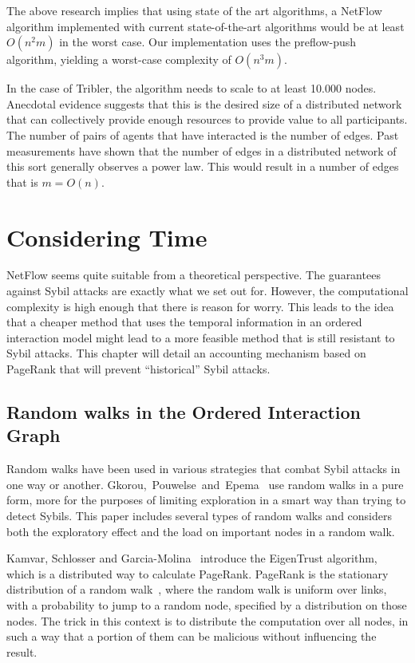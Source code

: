 \documentclass[a4paper,11pt]{book}
\theoremstyle{definition}
\begin{document}
The above research implies that using state of the art algorithms, a NetFlow algorithm
implemented with current state-of-the-art algorithms would be at least $O(n^2m)$ in the
worst case. Our implementation uses the preflow-push algorithm, yielding a worst-case
complexity of $O(n^3m)$. 

In the case of Tribler, the algorithm needs to scale to at least 10.000 nodes. Anecdotal
evidence suggests that this is the desired size of a distributed network that can collectively
provide enough resources to provide value to all participants. The number of pairs of agents
that have interacted is the number of edges. Past measurements have shown that the number
of edges in a distributed network of this sort generally observes a power law. 
This would result in a number of edges that is $m=O(n)$. 




\chapter{Considering Time}
\label{chap:temporal_pr}

NetFlow seems quite suitable from a theoretical perspective. The guarantees against Sybil 
attacks are exactly what we set out for. However, the computational complexity is high
enough that there is reason for worry. This leads to the idea that a cheaper method that uses
the temporal information in an ordered interaction model might lead to a more feasible method
that is still resistant to Sybil attacks. This chapter will detail an accounting mechanism
based on PageRank that will prevent ``historical'' Sybil attacks.


\section{Random walks in the Ordered Interaction Graph}

Random walks have been used in various strategies that combat Sybil attacks
in one way or another. Gkorou,~Pouwelse~and~Epema~\cite{gkorou2015trust} use random walks
in a pure form, more for the purposes of limiting exploration in
a smart way than trying to detect Sybils. This paper includes several types
of random walks and considers both the exploratory effect and the
load on important nodes in a random walk.

Kamvar, Schlosser and Garcia-Molina~\cite{kamvar2003eigentrust} introduce
the EigenTrust algorithm, which is a distributed way to calculate PageRank.
PageRank is the stationary distribution of a random walk~\cite{page1999pagerank},
where the random walk is uniform over links, with a probability to jump to a
random node, specified by a distribution on those nodes. The trick in this context
is to distribute the computation over all nodes, in such a way that a portion
of them can be malicious without influencing the result.
\end{document}
